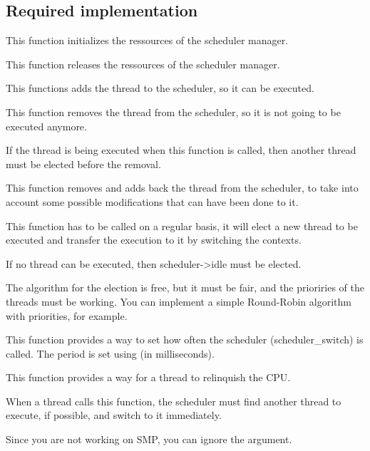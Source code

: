 \subsection*{Required implementation}

{
  This function initializes the ressources of the scheduler manager.
}

{
  This function releases the ressources of the scheduler manager.
}

{
  This functions adds the thread  to the scheduler, so it can
  be executed.
}

{
  This function removes the thread  from the scheduler, so it
  is not going to be executed anymore.

  \-

  If the thread is being executed when this function is called, then another
  thread must be elected before the removal.
}

{
  This function removes and adds back the thread  from the
  scheduler, to take into account some possible modifications that can have
  been done to it.
}

{
  This function has to be called on a regular basis, it will elect a new thread
  to be executed and transfer the execution to it by switching the contexts.

  \-

  If no thread can be executed, then scheduler->idle must be elected.
  
  \-

  The algorithm for the election is free, but it must be fair, and the
  prioriries of the threads must be working. You can implement a simple
  Round-Robin algorithm with priorities, for example.
}

{
  This function provides a way to set how often the scheduler
  (scheduler\_switch) is called. The period is set using  (in
  milliseconds).
}

{
  This function provides a way for a thread to relinquish the CPU.

  \-

  When a thread calls this function, the scheduler must find another thread
  to execute, if possible, and switch to it immediately.

  \-

  Since you are not working on SMP, you can ignore the 
  argument.
}

